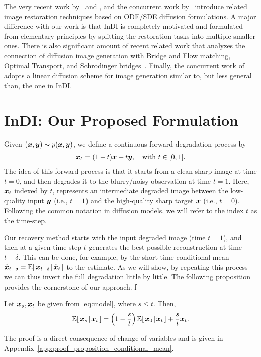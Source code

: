 \documentclass[10pt]{article} %
\begin{document}
The very recent work by~\citet{luo2023image} and \citet{welker2022blind}, and the concurrent work by~\citet{luo2023refusion,song2023consistency} introduce related image restoration techniques based on ODE/SDE diffusion formulations. A major difference with our work is that InDI is completely motivated and formulated from elementary principles by splitting the restoration tasks into multiple smaller ones. 
There is also significant amount of recent related work that analyzes the connection of diffusion image generation with Bridge and Flow matching, Optimal Transport, and Schrodinger bridges~\citep{albergo2023building,albergo2023stochastic,lipman2023flow,liu2023i2sb,liu2023flow,shi2023diffusion}.
Finally, the concurrent work of~\citet{heitz2023iterative} adopts a linear diffusion scheme for image generation similar to, but less general than, the one in InDI.




\section{InDI: Our Proposed Formulation}
Given $({\bm{x}},{\bm{y}}) \sim p({\bm{x}},{\bm{y}})$, we define a continuous forward degradation process by
\begin{align}
{\bm{x}}_t = (1-t) {\bm{x}} + t {\bm{y}}, \quad \text{with} \,\, t \in [0,1].
\label{eq:model}
\end{align}
The idea of this forward process is that it starts from a clean sharp image at time $t=0$, and then degrades it to the blurry/noisy observation at time $t=1$. Here, ${\bm{x}}_t$ indexed by $t$, represents an intermediate degraded image between the low-quality input ${\bm{y}}$ (i.e., $t=1$) and the high-quality sharp target ${\bm{x}}$ (i.e., $t=0$).  Following the common notation in diffusion models, we will refer to the index $t$ as the time-step. 

Our recovery method starts with the input degraded image (time $t=1$), and then at a given time-step $t$ generates the best possible reconstruction at time $t-\delta$.  This can be done, for example, by the short-time conditional mean $\hat{{\bm{x}}}_{t-\delta} = \mathbb{E}[\,{\bm{x}}_{t-\delta}\!\mid\!\hat {{\bm{x}}}_t\,]$ to the estimate. As we will show, by repeating this process we can thus invert the full degradation little by little. The following proposition provides the cornerstone of our approach.
f
\begin{proposition}
\label{prop:conditional_mean}
Let ${\bm{x}}_s, {\bm{x}}_t$  be given from \eqref{eq:model}, where $s \le t$. Then,
$$
\mathbb{E}[\,{\bm{x}}_s\!\mid\!{\bm{x}}_t\,] = \left(1 - \frac{s}{t}\right)  \mathbb{E}[\,{\bm{x}}_0\!\mid\!{\bm{x}}_t\,] + \frac{s}{t} {\bm{x}}_t.
$$
\end{proposition}
The proof is a direct consequence of change of variables and is given in Appendix~\ref{app:proof_proposition_conditional_mean}. 
\end{document}

